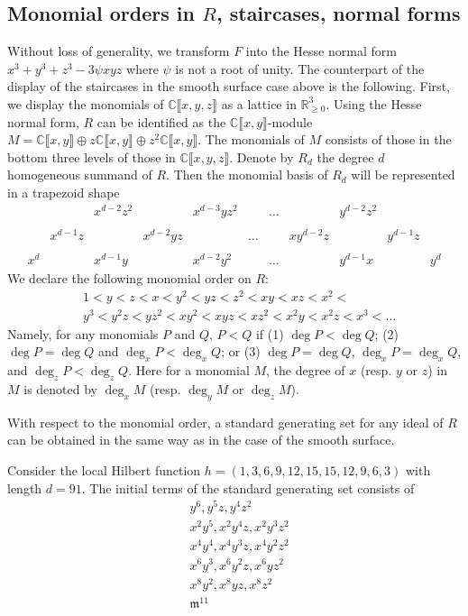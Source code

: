 \documentclass[12pt,oneside,reqno]{amsart}
\theoremstyle{definition}
\begin{document}
\subsection{Monomial orders in $R$, staircases, normal forms}
Without loss of generality, we transform $F$ into the Hesse normal form $x^3 + y^3 + z^3 - 3\psi xyz$ where $\psi$ is not a root of unity. The counterpart of the display of the staircases in the smooth surface case above is the following. First, we display the monomials of $\mathbb{C}\llbracket x, y, z \rrbracket$ as a lattice in $\mathbb{R}_{\geq 0}^3$. Using the Hesse normal form, $R$ can be identified as the $\mathbb{C}\llbracket x, y\rrbracket$-module $M = \mathbb{C}\llbracket x, y\rrbracket \oplus z \mathbb{C}\llbracket x, y\rrbracket \oplus z^2 \mathbb{C}\llbracket x, y\rrbracket$. The monomials of $M$ consists of those in the bottom three levels of those in $\mathbb{C}\llbracket x, y, z \rrbracket$. Denote by $R_d$ the degree $d$ homogeneous summand of $R$. Then the monomial basis of $R_d$ will be represented in a trapezoid shape
\[
\begin{matrix}
& & x^{d - 2}z^2 & & x^{d - 3}yz^2 & & \dots & & y^{d - 2}z^2 & & \\
& & & & & & & & & & \\
& x^{d - 1}z & &  x^{d - 2}yz & & \dots & & xy^{d - 2}z & & y^{d - 1}z & \\
& & & & & & & & & & \\
x^d & & x^{d - 1}y & & x^{d - 2}y^2 & & \dots & &  y^{d - 1}x & & y^d
\end{matrix}
\]
We declare the following monomial order on $R$:
\begin{align*}
& 1 < y < z < x < y^2 < yz < z^2 < xy < xz < x^2 < \\
& y^3 < y^2z < yz^2 < xy^2 < xyz < xz^2 < x^2y < x^2z < x^3 < \dots
\end{align*}
Namely, for any monomials $P$ and $Q$, $P < Q$ if (1) $\deg P < \deg Q$; (2) $\deg P = \deg Q$ and $\deg_x P < \deg_x Q$; or (3) $\deg P = \deg Q$, $\deg_x P = \deg_x Q$, and $\deg_z P < \deg_z Q$. Here for a monomial $M$, the degree of $x$ (resp. $y$ or $z$) in $M$ is denoted by $\deg_x M$ (resp. $\deg_y M$ or $\deg_z M$).

With respect to the monomial order, a standard generating set for any ideal of $R$ can be obtained in the same way as in the case of the smooth surface. 

Consider the local Hilbert function $h = (1, 3, 6, 9, 12, 15, 15, 12, 9, 6, 3)$ with length $d = 91$. The initial terms of the standard generating set consists of
\begin{align*}
& y^6, y^5z, y^4z^2 \\
& x^2y^5, x^2y^4z, x^2y^3z^2 \\
& x^4y^4, x^4y^3z, x^4y^2z^2 \\
& x^6y^3, x^6y^2z, x^6yz^2 \\
& x^8y^2, x^8yz, x^8z^2 \\
& \mathfrak{m}^{11}
\end{align*}
\end{document}
